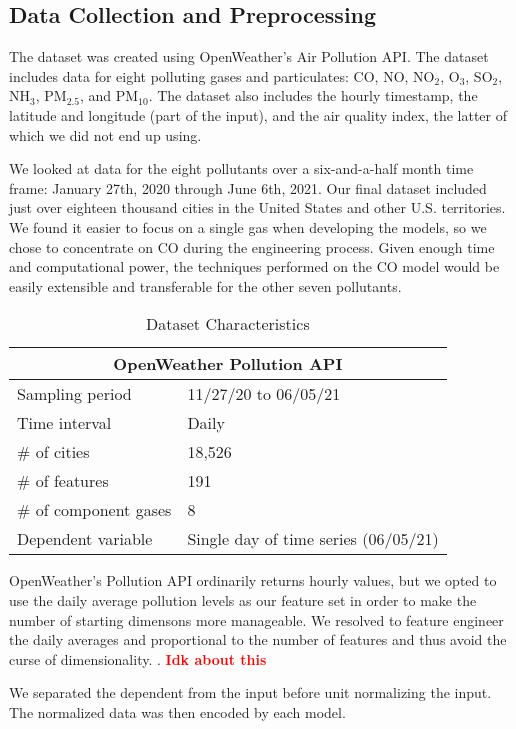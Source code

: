 \documentclass{article}
\newcommand\note[1]{\textbf{\textcolor{red}{#1}}}
\begin{document}
\subsection{Data Collection and Preprocessing}
The dataset was created using OpenWeather's Air Pollution API. The dataset includes data for 
eight polluting gases and particulates: CO, NO, NO$_2$, O$_3$, SO$_2$, NH$_3$, PM$_{2.5}$, 
and PM$_{10}$. The dataset also includes the hourly timestamp, the latitude and longitude (part of the input),
and the air quality index, the latter of which we did not end up using.\par
We looked at data for the eight pollutants over a six-and-a-half month time 
frame: January 27th, 2020 through June 6th, 2021. Our final 
dataset included just over eighteen thousand cities in the United States and other U.S. 
territories. We found it easier to focus on a single gas when developing 
the models, so we chose to concentrate on CO during the engineering process. Given
enough time and computational power, the techniques performed on the CO model would be 
easily extensible and transferable for the other seven pollutants.


\begin{table}[h!]
    \caption{Dataset Characteristics}
    \label{tab:table1}
    \vspace{0.1cm}
    \begin{tabular}{p{4cm}p{7cm}}
        \hline
        \multicolumn{2}{c}{OpenWeather Pollution API} \\
        \hline
        Sampling period  & 11/27/20 to 06/05/21\\
        Time interval & Daily  \\
        $\#$ of cities & 18,526 \\
        $\#$ of features & 191 \\
        $\#$ of component gases & 8 \\
        Dependent variable & Single day of time series (06/05/21) \\
        \hline
    \end{tabular}
\end{table}

OpenWeather's Pollution API ordinarily returns hourly values, but we opted to use the daily
average pollution levels as our feature set in order to make the number of starting dimensons
more manageable. We resolved to feature engineer the daily 
averages and proportional to the number of features and thus avoid the curse of dimensionality. 
\parencite{Trunk79}. \note{Idk about this} \par
We separated the dependent from the input before unit normalizing the input. 
The normalized data was then encoded by each model. 
\end{document}

